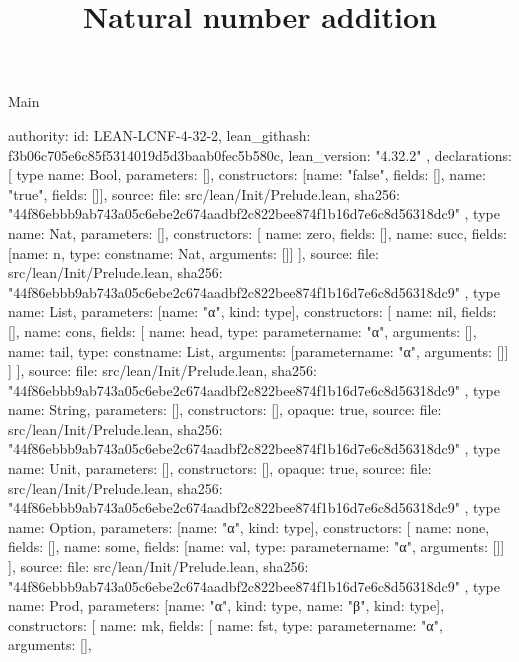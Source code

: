 \begin{lexlean}{Main}
\title{Natural number addition}
\begin{toolingmodule}
{
  authority: {
    id: LEAN-LCNF-4-32-2,
    lean_githash: f3b06c705e6c85f5314019d5d3baab0fec5b580c,
    lean_version: "4.32.2"
  },
  declarations: [
    type{
      name: Bool,
      parameters: [],
      constructors: [{name: "false", fields: []}, {name: "true", fields: []}],
      source: {
        file: src/lean/Init/Prelude.lean,
        sha256: "44f86ebbb9ab743a05c6ebe2c674aadbf2c822bee874f1b16d7e6c8d56318dc9"
      }
    },
    type{
      name: Nat,
      parameters: [],
      constructors: [
        {name: zero, fields: []},
        {name: succ, fields: [{name: n, type: const{name: Nat, arguments: []}}]}
      ],
      source: {
        file: src/lean/Init/Prelude.lean,
        sha256: "44f86ebbb9ab743a05c6ebe2c674aadbf2c822bee874f1b16d7e6c8d56318dc9"
      }
    },
    type{
      name: List,
      parameters: [{name: "α", kind: type{}}],
      constructors: [
        {name: nil, fields: []},
        {
          name: cons,
          fields: [
            {name: head, type: parameter{name: "α", arguments: []}},
            {name: tail, type: const{name: List, arguments: [parameter{name: "α", arguments: []}]}}
          ]
        }
      ],
      source: {
        file: src/lean/Init/Prelude.lean,
        sha256: "44f86ebbb9ab743a05c6ebe2c674aadbf2c822bee874f1b16d7e6c8d56318dc9"
      }
    },
    type{
      name: String,
      parameters: [],
      constructors: [],
      opaque: true,
      source: {
        file: src/lean/Init/Prelude.lean,
        sha256: "44f86ebbb9ab743a05c6ebe2c674aadbf2c822bee874f1b16d7e6c8d56318dc9"
      }
    },
    type{
      name: Unit,
      parameters: [],
      constructors: [],
      opaque: true,
      source: {
        file: src/lean/Init/Prelude.lean,
        sha256: "44f86ebbb9ab743a05c6ebe2c674aadbf2c822bee874f1b16d7e6c8d56318dc9"
      }
    },
    type{
      name: Option,
      parameters: [{name: "α", kind: type{}}],
      constructors: [
        {name: none, fields: []},
        {name: some, fields: [{name: val, type: parameter{name: "α", arguments: []}}]}
      ],
      source: {
        file: src/lean/Init/Prelude.lean,
        sha256: "44f86ebbb9ab743a05c6ebe2c674aadbf2c822bee874f1b16d7e6c8d56318dc9"
      }
    },
    type{
      name: Prod,
      parameters: [{name: "α", kind: type{}}, {name: "β", kind: type{}}],
      constructors: [
        {
          name: mk,
          fields: [
            {name: fst, type: parameter{name: "α", arguments: []}},
}}}
\end{toolingmodule}
\end{lexlean}
